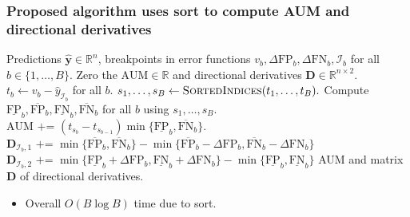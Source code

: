 \documentclass[t]{beamer}
\begin{document}
\begin{frame}
  \frametitle{Proposed algorithm uses sort to compute AUM and directional derivatives}

\small
\begin{algorithmic}[1]
  Predictions $\mathbf{\hat y}\in\mathbb R^n$, 
  breakpoints in error functions $v_b,\Delta\text{FP}_b,\Delta\text{FN}_b,\mathcal I_b$ for all $b\in\{1,\dots,B\}$.
  \STATE Zero the $\text{AUM}\in\mathbb R$ and directional derivatives $\mathbf D\in\mathbb R^{n\times 2}$.\label{line:init-zero}
  \STATE $t_b\gets v_b - \hat y_{\mathcal I_b}$ for all $b$.\label{line:compute-thresh}
  \STATE $s_1,\dots,s_B\gets \textsc{SortedIndices}(t_1,\dots,t_B).$\label{line:sorted-indices}
  \STATE Compute $\underline{\text{FP}}_b,\overline{\text{FP}}_b,\underline{\text{FN}}_b,\overline{\text{FN}}_b$ for all $b$ using $s_1,\dots,s_B$.
  \label{line:for-intervals}
  \STATE $\text{AUM} \text{ += } (t_{s_b} - t_{s_{b-1}}) \min\{\underline{\text{FP}}_b, \overline{\text{FN}}_b\} $.\label{line:AUM}
  \ENDFOR
  \label{line:for-breakpoints}
  \STATE\label{line:D_lo} $\mathbf D_{\mathcal I_b,1} \text{ += } \min\{
  \overline{\text{FP}}_b , 
  \overline{\text{FN}}_b 
  \}
  -
  \min\{
  \overline{\text{FP}}_b - \Delta\text{FP}_b, 
  \overline{\text{FN}}_b - \Delta\text{FN}_b
  \}$
  \STATE\label{line:D_hi} $\mathbf D_{\mathcal I_b,2} \text{ += } \min\{
  \underline{\text{FP}}_b + \Delta\text{FP}_b, 
  \underline{\text{FN}}_b + \Delta\text{FN}_b
  \}
  -
  \min\{
  \underline{\text{FP}}_b , 
  \underline{\text{FN}}_b 
  \}$
  \ENDFOR
   AUM and matrix $\mathbf D$ of directional derivatives.
\end{algorithmic}
\begin{itemize}
\item 
 Overall $O(B\log B)$ time due to sort.
\end{itemize}
  
\end{frame}
\end{document}
